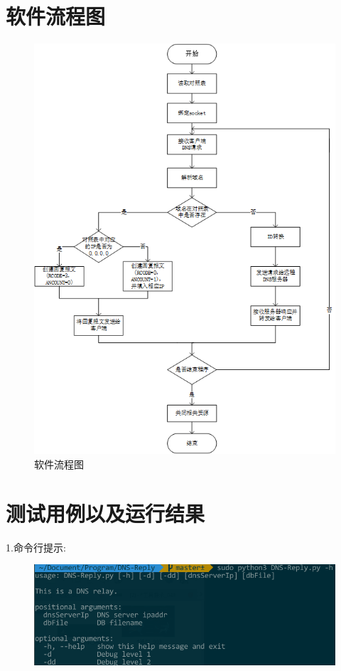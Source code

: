 \documentclass{ctexart}
\begin{document}
\section{软件流程图}
\label{sec:chart}
\begin{figure}[H]
  \centering
  \includegraphics[width=15cm]{img/chart.png}
  \caption{软件流程图}
\end{figure}

\section{测试用例以及运行结果}
\label{run_result}
1.命令行提示:
\begin{figure}[H]
  \centering
  \includegraphics[width=15cm]{img/help.png}
\end{figure}
\end{document}
